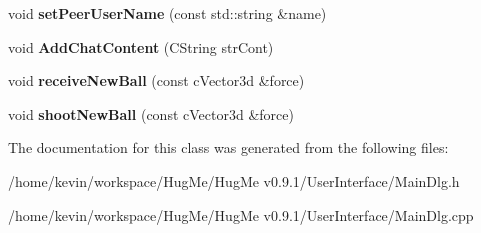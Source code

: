 \begin{DoxyCompactItemize}
\item 
\hypertarget{classCMainDlg_ab058737971aa5c0ba4646ab2623e6b84}{
void {\bfseries setPeerUserName} (const std::string \&name)}
\label{classCMainDlg_ab058737971aa5c0ba4646ab2623e6b84}

\item 
\hypertarget{classCMainDlg_ae693fe41d98817879fdfe7b496acea37}{
void {\bfseries AddChatContent} (CString strCont)}
\label{classCMainDlg_ae693fe41d98817879fdfe7b496acea37}

\item 
\hypertarget{classCMainDlg_a152281efc2cca4f50ab722f9aa2f2f50}{
void {\bfseries receiveNewBall} (const cVector3d \&force)}
\label{classCMainDlg_a152281efc2cca4f50ab722f9aa2f2f50}

\item 
\hypertarget{classCMainDlg_a7e97dab693cdf5dfea3ccc37bbd9f20a}{
void {\bfseries shootNewBall} (const cVector3d \&force)}
\label{classCMainDlg_a7e97dab693cdf5dfea3ccc37bbd9f20a}

\end{DoxyCompactItemize}


The documentation for this class was generated from the following files:\begin{DoxyCompactItemize}
\item 
/home/kevin/workspace/HugMe/HugMe v0.9.1/UserInterface/MainDlg.h\item 
/home/kevin/workspace/HugMe/HugMe v0.9.1/UserInterface/MainDlg.cpp\end{DoxyCompactItemize}
